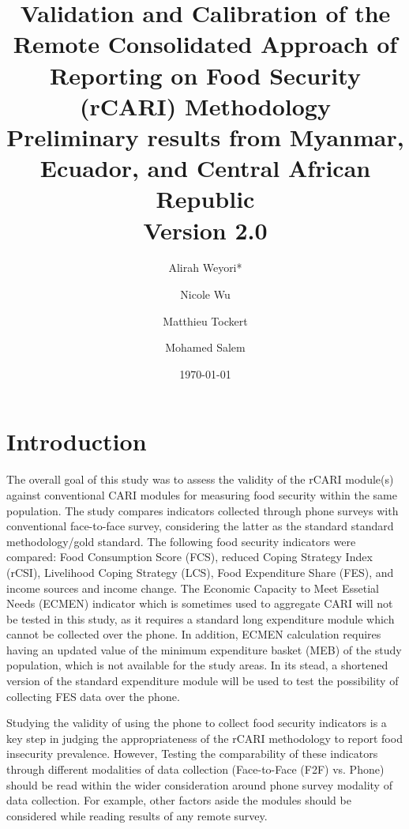 \documentclass[11pt,harvard]{article}
\author{Alirah Weyori*  \and   Nicole Wu  \and  Matthieu Tockert  \and  Mohamed Salem}
\date{\today}
\title{Validation and Calibration of the Remote Consolidated Approach of Reporting on Food Security (rCARI) Methodology 
	\\ {\normalsize Preliminary results from Myanmar, Ecuador, and Central African Republic} 
	\\{\normalsize{Version 2.0}} }
\begin{document}
	\maketitle \vspace{-1cm}
	\onehalfspacing
	\pagebreak
	\setlength{\parskip}{8pt} %
	
	\tableofcontents
	\pagebreak
		
\section{Introduction}

The overall goal of this study was to assess the validity of the rCARI module(s) against conventional CARI modules for measuring food security within the same population. The study compares indicators collected through phone surveys with conventional face-to-face survey, considering the latter as the standard standard methodology/gold standard. The following food security indicators were compared: Food Consumption Score (FCS), reduced Coping Strategy Index (rCSI), Livelihood Coping Strategy (LCS), Food Expenditure Share (FES), and income sources and income change. The Economic Capacity to Meet Essetial Needs (ECMEN) indicator which is sometimes used to aggregate CARI will not be tested in this study, as it requires a standard long expenditure module which cannot be collected over the phone. In addition, ECMEN calculation requires having an updated value of the minimum expenditure basket (MEB) of the study population, which is not available for the study areas. In its stead, a shortened version of the standard expenditure module will be used to test the possibility of collecting FES data over the phone.

Studying the validity of using the phone to collect food security indicators is a key step in judging the appropriateness of the rCARI methodology to report food insecurity prevalence. However, Testing the comparability of these indicators through different modalities of data collection (Face-to-Face (F2F) vs. Phone) should be read within the wider consideration around phone survey modality of data collection. For example, other factors aside the modules should be considered while reading results of any remote survey.
\end{document}
